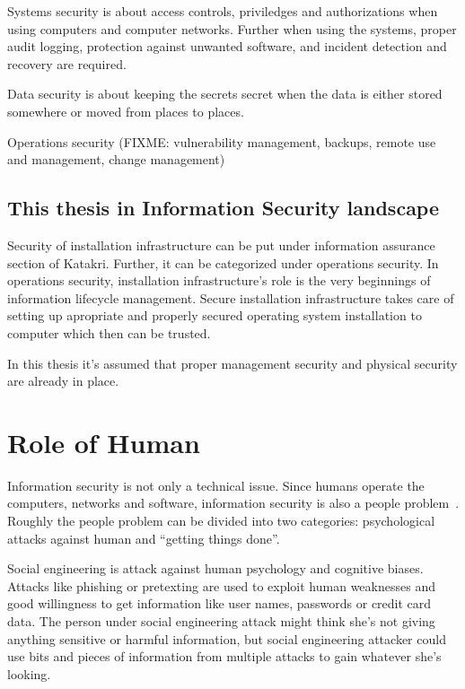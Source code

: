 Systems security is about access controls, priviledges and
authorizations when using computers and computer networks. Further
when using the systems, proper audit logging, protection against
unwanted software, and incident detection and recovery are required.

Data security is about keeping the secrets secret when the data is
either stored somewhere or moved from places to places.

Operations security (FIXME: vulnerability management, backups, remote
use and management, change management)


\subsection{This thesis in Information Security landscape}

Security of installation infrastructure can be put under information
assurance section of Katakri. Further, it can be categorized under
operations security. In operations security, installation
infrastructure's role is the very beginnings of information lifecycle
management. Secure installation infrastructure takes care of setting
up apropriate and properly secured operating system installation to
computer which then can be trusted.

In this thesis it's assumed that proper management security and
physical security are already in place.


\section{Role of Human}

Information security is not only a technical issue. Since humans
operate the computers, networks and software, information security is
also a people problem~\cite{parsons2010human}\cite{anderson}. Roughly
the people problem can be divided into two categories: psychological
attacks against human and ``getting things done''.

Social engineering is attack against human psychology and cognitive
biases. Attacks like phishing or pretexting are used to exploit human
weaknesses and good willingness to get information like user names,
passwords or credit card data. The person under social engineering
attack might think she's not giving anything sensitive or harmful
information, but social engineering attacker could use bits and pieces
of information from multiple attacks to gain whatever she's
looking\cite{greavu2014social}\cite{anderson}.

